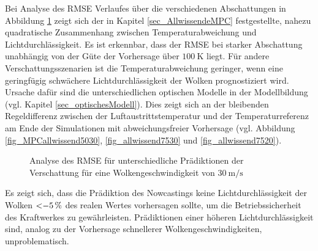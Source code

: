 Bei Analyse des RMSE Verlaufes über die verschiedenen Abschattungen in Abbildung \ref{fig_shadingrmse} zeigt sich der in Kapitel \ref{sec_AllwissendeMPC} festgestellte, nahezu quadratische Zusammenhang zwischen Temperaturabweichung und Lichtdurchlässigkeit.
Es ist erkennbar, dass der RMSE bei starker Abschattung unabhängig von der Güte der Vorhersage über $\SI{100}{\kelvin}$ liegt.
Für andere Verschattungsszenarien ist die Temperaturabweichung geringer, wenn eine geringfügig schwächere Lichtdurchlässigkeit der Wolken prognostiziert wird.
Ursache dafür sind die unterschiedlichen optischen Modelle in der Modellbildung (vgl. Kapitel \ref{sec_optischesModell}).
Dies zeigt sich an der bleibenden Regeldifferenz zwischen der Luftaustrittstemperatur und der Temperaturreferenz am Ende der Simulationen mit abweichungsfreier Vorhersage (vgl. Abbildung \ref{fig_MPCallwissend5030}, \ref{fig_allwissend7530} und \ref{fig_allwissend7520}).\pagebreak

\begin{figure}[t]
    \centering
    \setlength{\fboxsep}{1pt}
    \setlength{\fboxrule}{1pt}
    \caption[Analyse des RMSE für unterschiedliche Prädiktionen der Verschattung für eine Wolkengeschwindigkeit von $\SI{30}{\metre\per\second}$]{Analyse des RMSE für unterschiedliche Prädiktionen der Verschattung für eine Wolkengeschwindigkeit von $\SI{30}{\metre\per\second}$}
    \label{fig_shadingrmse}
\end{figure}

Es zeigt sich, dass die Prädiktion des Nowcastings keine Lichtdurchlässigkeit der Wolken $\SI{<-5}{\percent}$ des realen Wertes vorhersagen sollte, um die Betriebssicherheit des Kraftwerkes zu gewährleisten.
Prädiktionen einer höheren Lichtdurchlässigkeit sind, analog zu der Vorhersage schnellerer Wolkengeschwindigkeiten, unproblematisch.
